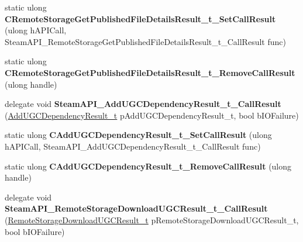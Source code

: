 \begin{DoxyCompactItemize}
static ulong {\bfseries C\+Remote\+Storage\+Get\+Published\+File\+Details\+Result\+\_\+t\+\_\+\+Set\+Call\+Result} (ulong h\+A\+P\+I\+Call, Steam\+A\+P\+I\+\_\+\+Remote\+Storage\+Get\+Published\+File\+Details\+Result\+\_\+t\+\_\+\+Call\+Result func)
\item 
\mbox{\label{class_valve_1_1_interop_1_1_native_entrypoints_a8201a33d64c08c6ccd969cd72a395907}} 
static ulong {\bfseries C\+Remote\+Storage\+Get\+Published\+File\+Details\+Result\+\_\+t\+\_\+\+Remove\+Call\+Result} (ulong handle)
\item 
\mbox{\label{class_valve_1_1_interop_1_1_native_entrypoints_aea15528cf3b6b0759b57bdd028a243e6}} 
delegate void {\bfseries Steam\+A\+P\+I\+\_\+\+Add\+U\+G\+C\+Dependency\+Result\+\_\+t\+\_\+\+Call\+Result} (\hyperlink{struct_valve_1_1_steamworks_1_1_add_u_g_c_dependency_result__t}{Add\+U\+G\+C\+Dependency\+Result\+\_\+t} p\+Add\+U\+G\+C\+Dependency\+Result\+\_\+t, bool b\+I\+O\+Failure)
\item 
\mbox{\label{class_valve_1_1_interop_1_1_native_entrypoints_a48061d72d76131563172c26bfb063041}} 
static ulong {\bfseries C\+Add\+U\+G\+C\+Dependency\+Result\+\_\+t\+\_\+\+Set\+Call\+Result} (ulong h\+A\+P\+I\+Call, Steam\+A\+P\+I\+\_\+\+Add\+U\+G\+C\+Dependency\+Result\+\_\+t\+\_\+\+Call\+Result func)
\item 
\mbox{\label{class_valve_1_1_interop_1_1_native_entrypoints_accb77501d5dd46b553d955b24a136637}} 
static ulong {\bfseries C\+Add\+U\+G\+C\+Dependency\+Result\+\_\+t\+\_\+\+Remove\+Call\+Result} (ulong handle)
\item 
\mbox{\label{class_valve_1_1_interop_1_1_native_entrypoints_ad0810e00e3b918aba0fccb379d99f859}} 
delegate void {\bfseries Steam\+A\+P\+I\+\_\+\+Remote\+Storage\+Download\+U\+G\+C\+Result\+\_\+t\+\_\+\+Call\+Result} (\hyperlink{struct_valve_1_1_steamworks_1_1_remote_storage_download_u_g_c_result__t}{Remote\+Storage\+Download\+U\+G\+C\+Result\+\_\+t} p\+Remote\+Storage\+Download\+U\+G\+C\+Result\+\_\+t, bool b\+I\+O\+Failure)
\item 
\mbox{\label{class_valve_1_1_interop_1_1_native_entrypoints_aee33341723e8f9c998ff1f73b5954c45}} 

\end{DoxyCompactItemize}
